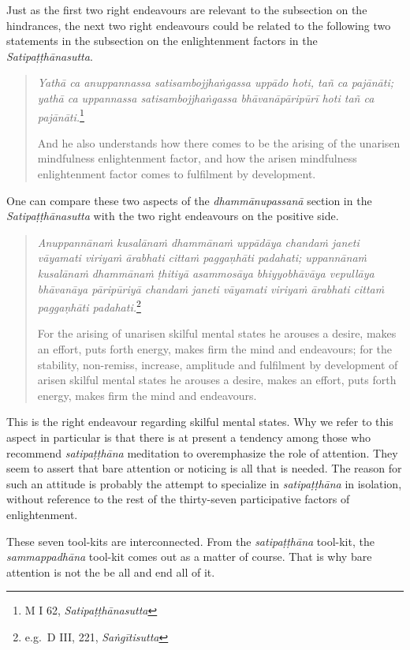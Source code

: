 Just as the first two right endeavours are relevant to the subsection on the hindrances, the next two right endeavours could be related to the following two statements in the subsection on the enlightenment factors in the \emph{Satipaṭṭhānasutta}.

\begin{quote}
\emph{Yathā ca anuppannassa satisambojjhaṅgassa uppādo hoti, tañ ca pajānāti; yathā ca uppannassa satisambojjhaṅgassa bhāvanāpāripūrī hoti tañ ca pajānāti.}\footnote{M I 62, \emph{Satipaṭṭhānasutta}}

And he also understands how there comes to be the arising of the unarisen mindfulness enlightenment factor, and how the arisen mindfulness enlightenment factor comes to fulfilment by development.
\end{quote}

One can compare these two aspects of the \emph{dhammānupassanā} section in the \emph{Satipaṭṭhānasutta} with the two right endeavours on the positive side.

\begin{quote}
\emph{Anuppannānaṁ kusalānaṁ dhammānaṁ uppādāya chandaṁ janeti vāyamati viriyaṁ ārabhati cittaṁ paggaṇhāti padahati; uppannānaṁ kusalānaṁ dhammānaṁ ṭhitiyā asammosāya bhiyyobhāvāya vepullāya bhāvanāya pāripūriyā chandaṁ janeti vāyamati viriyaṁ ārabhati cittaṁ paggaṇhāti padahati.}\footnote{e.g.~D III, 221, \emph{Saṅgītisutta}}

For the arising of unarisen skilful mental states he arouses a desire, makes an effort, puts forth energy, makes firm the mind and endeavours; for the stability, non-remiss, increase, amplitude and fulfilment by development of arisen skilful mental states he arouses a desire, makes an effort, puts forth energy, makes firm the mind and endeavours.
\end{quote}

This is the right endeavour regarding skilful mental states. Why we refer to this aspect in particular is that there is at present a tendency among those who recommend \emph{satipaṭṭhāna} meditation to overemphasize the role of attention. They seem to assert that bare attention or noticing is all that is needed. The reason for such an attitude is probably the attempt to specialize in \emph{satipaṭṭhāna} in isolation, without reference to the rest of the thirty-seven participative factors of enlightenment.

These seven tool-kits are interconnected. From the \emph{satipaṭṭhāna} tool-kit, the \emph{sammappadhāna} tool-kit comes out as a matter of course. That is why bare attention is not the be all and end all of it.

